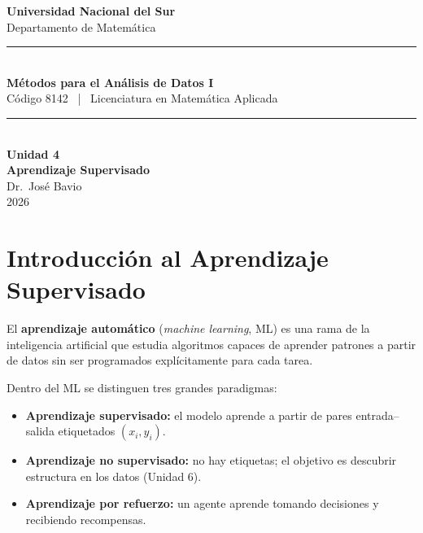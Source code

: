 \documentclass[12pt, a4paper]{article}
\theoremstyle{definition}
\theoremstyle{plain}
\theoremstyle{remark}
\begin{document}

\begin{titlepage}
  \begin{center}
    \vspace*{1.5cm}
    {\Large \textbf{\textcolor{unsblue}{Universidad Nacional del Sur}}}\\[0.3cm]
    {\large Departamento de Matemática}\\[1.5cm]

    \rule{\textwidth}{1.5pt}\\[0.4cm]
    {\LARGE \textbf{\textcolor{unsblue}{Métodos para el Análisis de Datos I}}}\\[0.4cm]
    {\large Código 8142 \, | \, Licenciatura en Matemática Aplicada}\\[0.3cm]
    \rule{\textwidth}{1.5pt}\\[1.5cm]

    {\Huge \textbf{Unidad 4}}\\[0.5cm]
    {\LARGE \textbf{\textcolor{unsblue}{Aprendizaje Supervisado}}}\\[2.5cm]

    {\large Dr.\ José Bavio}\\[0.3cm]
    {\large 2026}
  \end{center}
\end{titlepage}

\tableofcontents
\newpage

\section{Introducción al Aprendizaje Supervisado}

El \textbf{aprendizaje automático} (\textit{machine learning}, ML) es una rama de la inteligencia artificial que estudia algoritmos capaces de aprender patrones a partir de datos sin ser programados explícitamente para cada tarea.

Dentro del ML se distinguen tres grandes paradigmas:

\begin{itemize}
  \item \textbf{Aprendizaje supervisado:} el modelo aprende a partir de pares entrada--salida etiquetados $(x_i, y_i)$.
  \item \textbf{Aprendizaje no supervisado:} no hay etiquetas; el objetivo es descubrir estructura en los datos (Unidad 6).
  \item \textbf{Aprendizaje por refuerzo:} un agente aprende tomando decisiones y recibiendo recompensas.
\end{itemize}
\end{document}
